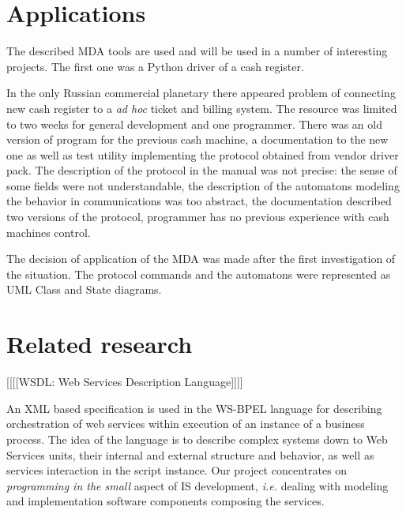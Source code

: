 \documentclass[conference,a4paper]{IEEEtran}
\begin{document}
\section{Applications}
\label{sec:app}

The described MDA tools are used and will be used in a number of interesting projects.  The first one was a Python driver of a cash register.

In the only Russian commercial planetary there appeared problem of connecting new cash register to a \emph{ad hoc} ticket and billing system.  The resource was limited to two weeks for general development and one programmer.  There was an old version of program for the previous cash machine, a documentation to the new one as well as test utility implementing the protocol obtained from vendor driver pack.  The description of the protocol in the manual was not precise: the sense of some fields were not understandable, the description of the automatons modeling the behavior in communications was too abstract, the documentation described two versions of the protocol, programmer has no previous experience with cash machines control.

The decision of application of the MDA was made after the first investigation of the situation.  The protocol commands and the automatons were represented as UML Class and State diagrams.

\section{Related research}
\label{sec:rel}

[[[[WSDL: Web Services Description Language]]]]

An XML based specification is used in the WS-BPEL language \cite{wsbpel} for describing orchestration of web services within execution of an instance of a business process.  The idea of the language is to describe complex systems down to Web Services units, their internal and external structure and behavior, as well as services interaction in the script instance. Our project concentrates on \emph{programming in the small} aspect of IS development, \emph{i.e.} dealing with modeling and implementation software components composing the services.


\end{document}
